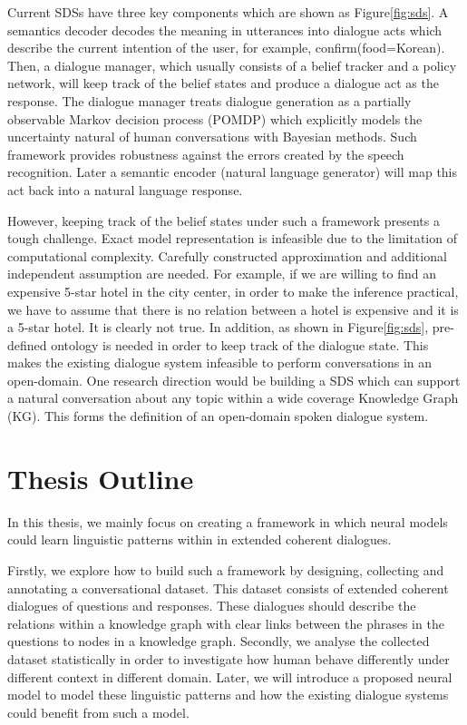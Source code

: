 \documentclass[bsc,frontabs,twoside,singlespacing,parskip,deptreport]{infthesis}     %
\begin{document}
Current SDSs have three key components which are shown as Figure\ref{fig:sds}. A semantics decoder decodes the meaning in utterances into dialogue acts which describe the current intention of the user, for example, confirm(food=Korean). Then, a dialogue manager, which usually consists of a belief tracker and a policy network, will keep track of the belief states and produce a dialogue act as the response. The dialogue manager treats dialogue generation as a partially observable Markov decision process (POMDP)\cite{williams2007partially,young2013pomdp,young2010hidden} which explicitly models the uncertainty natural of human conversations with Bayesian methods. Such framework provides robustness against the errors created by the speech recognition. Later a semantic encoder (natural language generator) will map this act back into a natural language response.

However, keeping track of the belief states under such a framework presents a tough challenge. Exact model representation is infeasible due to the limitation of computational complexity\cite{young2013pomdp}. Carefully constructed approximation and additional independent assumption are needed. For example, if we are willing to find an expensive 5-star hotel in the city center, in order to make the inference practical, we have to assume that there is no relation between a hotel is expensive and it is a 5-star hotel. It is clearly not true. In addition, as shown in Figure\ref{fig:sds}, pre-defined ontology is needed in order to keep track of the dialogue state. This makes the existing dialogue system infeasible to perform conversations in an open-domain. One research direction would be building a SDS which can support a natural conversation about any topic within a wide coverage Knowledge Graph (KG). This forms the definition of an open-domain spoken dialogue system\cite{opendomain}.




\section {Thesis Outline}

In this thesis, we mainly focus on creating a framework in which neural models could learn linguistic patterns within in extended coherent dialogues.

Firstly, we explore how to build such a framework by designing, collecting and annotating a conversational dataset. This dataset consists of extended coherent dialogues of questions and responses. These dialogues should describe the relations within a knowledge graph with clear links between the phrases in the questions to nodes in a knowledge graph. Secondly, we analyse the collected dataset statistically in order to investigate how human behave differently under different context in different domain. Later, we will introduce a proposed neural model to model these linguistic patterns and how the existing dialogue systems could benefit from such a model.
\end{document}
